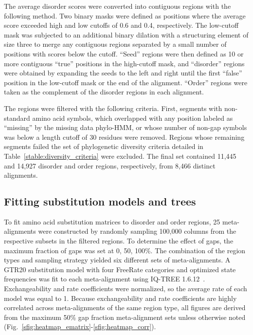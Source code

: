 The average disorder scores were converted into contiguous regions with the following method. Two binary masks were defined as positions where the average score exceeded high and low cutoffs of 0.6 and 0.4, respectively. The low-cutoff mask was subjected to an additional binary dilation with a structuring element of size three to merge any contiguous regions separated by a small number of positions with scores below the cutoff. ``Seed'' regions were then defined as 10 or more contiguous ``true'' positions in the high-cutoff mask, and ``disorder'' regions were obtained by expanding the seeds to the left and right until the first ``false'' position in the low-cutoff mask or the end of the alignment. ``Order'' regions were taken as the complement of the disorder regions in each alignment.

The regions were filtered with the following criteria. First, segments with non-standard amino acid symbols, which overlapped with any position labeled as ``missing'' by the missing data phylo-HMM, or whose number of non-gap symbols was below a length cutoff of 30 residues were removed. Regions whose remaining segments failed the set of phylogenetic diversity criteria detailed in Table~\ref{stable:diversity_criteria} were excluded. The final set contained 11,445 and 14,927 disorder and order regions, respectively, from 8,466 distinct alignments.

\subsection{Fitting substitution models and trees}
To fit amino acid substitution matrices to disorder and order regions, 25 meta-alignments were constructed by randomly sampling 100,000 columns from the respective subsets in the filtered regions. To determine the effect of gaps, the maximum fraction of gaps was set at 0, 50, 100\%. The combination of the region types and sampling strategy yielded six different sets of meta-alignments. A GTR20 substitution model with four FreeRate categories and optimized state frequencies was fit to each meta-alignment using IQ-TREE 1.6.12~\cite{Nguyen2014}. Exchangeability and rate coefficients were normalized, so the average rate of each model was equal to 1. Because exchangeability and rate coefficients are highly correlated across meta-alignments of the same region type, all figures are derived from the maximum 50\% gap fraction meta-alignment sets unless otherwise noted (Fig.~\ref{sfig:heatmap_ematrix}-\ref{sfig:heatmap_corr}).

